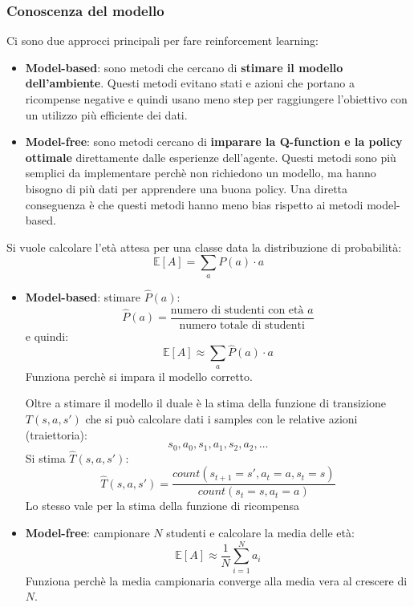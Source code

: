 \documentclass[a4paper]{article}
\begin{document}
\subsubsection{Conoscenza del modello}
Ci sono due approcci principali per fare reinforcement learning:
\begin{itemize}
  \item \textbf{Model-based}: sono metodi che cercano di \textbf{stimare il modello
    dell'ambiente}. Questi metodi evitano stati e azioni che portano a ricompense negative
    e quindi usano meno step per raggiungere l'obiettivo con un utilizzo più efficiente
    dei dati.

  \item \textbf{Model-free}: sono metodi cercano di \textbf{imparare la Q-function
    e la policy ottimale} direttamente dalle esperienze dell'agente. Questi metodi
    sono più semplici da implementare perchè non richiedono un modello, ma hanno
    bisogno di più dati per apprendere una buona policy. Una diretta conseguenza
    è che questi metodi hanno meno bias rispetto ai metodi model-based.
\end{itemize}
\begin{example}
  Si vuole calcolare l'età attesa per una classe data la distribuzione di
  probabilità:
  \[
    \mathbb{E}[A] = \sum_a P(a) \cdot a
  \] 
  \begin{itemize}
    \item \textbf{Model-based}: stimare \( \hat{P}(a) \):
      \[
        \hat{P}(a) = \frac{\text{numero di studenti con età } a}{\text{numero totale di studenti}}
      \] 
      e quindi:
      \[
        \mathbb{E}[A] \approx \sum_a \hat{P}(a) \cdot a
      \] 
      Funziona perchè si impara il modello corretto.

      \vspace{1em}
      \noindent
       Oltre a stimare il modello il duale è la stima della funzione
       di transizione \( T(s, a, s') \) che si può calcolare dati i samples
       con le relative azioni (traiettoria):
       \[
         s_0, a_0, s_1, a_1, s_2, a_2, \ldots
       \] 
       Si stima \( \hat{T}(s, a, s') \):
       \[
       \hat{T}(s, a, s') = \frac{count(s_{t+1} = s', a_t = a, s_t = s)}{count(s_t = s, a_t = a)}
       \] 
       Lo stesso vale per la stima della funzione di ricompensa

    \item \textbf{Model-free}: campionare \( N \) studenti e calcolare la media delle età:
      \[
        \mathbb{E}[A] \approx \frac{1}{N} \sum_{i=1}^{N} a_i
      \] 
      Funziona perchè la media campionaria converge alla media vera al crescere di \( N \).
  \end{itemize}
\end{example}
\end{document}
